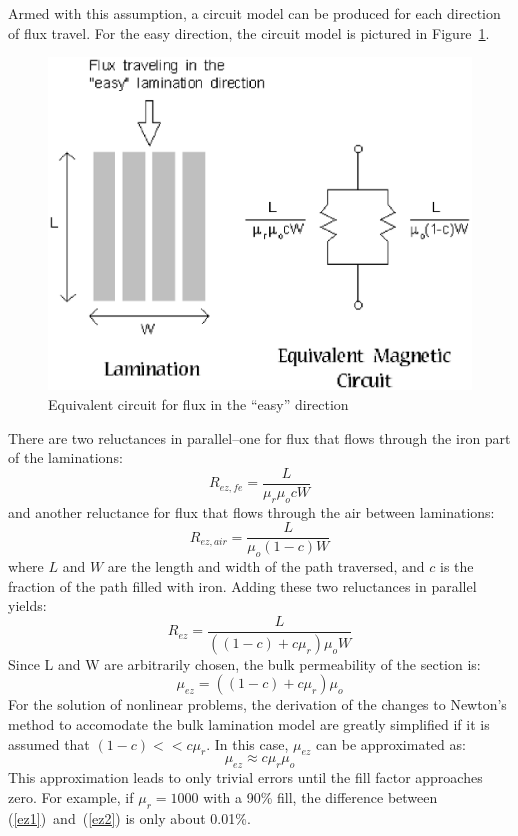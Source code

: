 \documentclass[12pt]{report}
\newcommand{\be}{\begin{equation}}
\newcommand{\ee}{\end{equation}}
\begin{document}
Armed with this assumption, a circuit model can be produced for
each direction of flux travel.  For the easy direction, the circuit
model is pictured in Figure~\ref{easydirection}.
\begin{figure}
\centerline{\includegraphics{ezlam.ps}}
\caption{Equivalent circuit for flux in the ``easy'' direction}
\label{easydirection}
\end{figure}
There are two reluctances in parallel--one for flux that flows
through the iron part of the laminations:
\be R_{ez,fe} = \frac{L}{\mu_r \mu_o c W} \ee
 and another reluctance for flux that flows through the air between laminations:
\be R_{ez,air} = \frac{L}{\mu_o (1-c) W} \ee
where $L$ and $W$ are the length and width of the path traversed,
and $c$ is the fraction of the path filled with iron. Adding these
two reluctances in parallel yields:
\be R_{ez} = \frac{L}{ ((1-c) + c \mu_r) \mu_o W }\ee
Since L and W are arbitrarily chosen, the bulk permeability of the
section is:
\be \label{ez1} \mu_{ez}= ((1-c) + c \mu_r) \mu_o \ee
For the solution of nonlinear problems, the derivation of the
changes to Newton's method to accomodate the bulk lamination model
are greatly simplified if it is assumed that $(1-c) << c
\mu_r$. In this case, $\mu_{ez}$ can be approximated as:
\be \label{ez2} \mu_{ez} \approx c \mu_r \mu_o \ee
This approximation leads to only trivial errors until the fill
factor approaches zero.  For example, if $\mu_r=1000$ with a 90\%
fill, the difference between (\ref{ez1})~and~(\ref{ez2}) is only
about 0.01\%.
\end{document}
